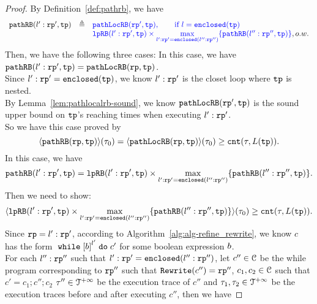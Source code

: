\begin{proof}
By Definition~\ref{def:pathrb}, we have 
\[  
  \begin{array}{rcl}
  \inoutB(l': \rprog', \tpath) & \triangleq & 
  \highlight{\outinB(\rprog', \tpath), \qquad \text{if } l = \kw{enclosed}(\tpath)}
  \\ &  & 
  \highlight{
    \lpchB(l':\rprog', \tpath )
  \times \max\limits_{l': \rprog' = \kw{enclosed}(l'':\rprog'')}
  \{\inoutB(l'':\rprog'', \tpath)\} }, o.w.
  \end{array}
\]
%
Then, we have the following three cases:
In this case, we have $\mathtt{pathRB}(l': \mathtt{rp}', \mathtt{tp}) = {\mathtt{pathLocRB}(\mathtt{rp}, \mathtt{tp})}$.
\\
Since $l': \mathtt{rp}' = \mathtt{enclosed}(\mathtt{tp})$, we know $l': \mathtt{rp}'$ is the closet loop where $\mathtt{tp}$ is nested.
\\
By Lemma~\ref{lem:pathlocalrb-sound}, we know $\mathtt{pathLocRB}(\mathtt{rp}', \mathtt{tp})$ is the
sound upper bound on $\mathtt{tp}$'s reaching times when executing $l': \mathtt{rp}'$. 
\\
So we have this case proved by
\[
  \langle \mathtt{pathRB}(\mathtt{rp}, \mathtt{tp}) \rangle(\mathtt{\tau}_0) = \langle \mathtt{pathLocRB}(\mathtt{rp}, \mathtt{tp}) \rangle(\mathtt{\tau}_0) \geq \mathtt{cnt}(\mathtt{\tau}, L(\mathtt{tp})).
\]
%
In this case, we have 
\[
  \mathtt{pathRB}(l': \mathtt{rp}', \mathtt{tp}) = \mathtt{lpRB}(l':\mathtt{rp}', \mathtt{tp} )
  \times \max\limits_{l': \mathtt{rp}' = \mathtt{enclosed}(l'':\mathtt{rp}'')}
  \{\mathtt{pathRB}(l'':\mathtt{rp}'', \mathtt{tp})\}.
\]
Then we need to show:
\[
  \langle \mathtt{lpRB}(l':\mathtt{rp}', \mathtt{tp} )
  \times \max\limits_{l': \mathtt{rp}' = \mathtt{enclosed}(l'':\mathtt{rp}'')}
  \{\mathtt{pathRB}(l'':\mathtt{rp}'', \mathtt{tp})\} \rangle(\mathtt{\tau}_0) 
  \geq \mathtt{cnt}(\mathtt{\tau}, L(\mathtt{tp})).
  \]
%
Since $\mathtt{rp} = l': \mathtt{rp}'$, according to Algorithm~\ref{alg:alg-refine_rewrite}, we know $c$ has the form
$\ewhile \clabel{\bexpr}^{l'} \edo c'$ for some boolean expression $b$.
\\
For each $l'':\mathtt{rp}''$ such that $l': \mathtt{rp}' = \mathtt{enclosed}(l'':\mathtt{rp}'')$, 
let $c''\in \mathcal{C}$ be the while program corresponding to $\mathtt{rp}''$ such that $\mathtt{Rewrite}(c'') = \mathtt{rp}''$,
$c_1, c_2 \in \mathcal{C}$ such that $c' = c_1; c''; c_2$
$\mathtt{\tau}'' \in \mathcal{T}^{+\infty}$ be the execution trace of $c''$ and $\mathtt{\tau}_1, \mathtt{\tau}_2 \in \mathcal{T}^{+\infty}$ be the execution traces before and after executing $c''$, then we have

\end{proof}
